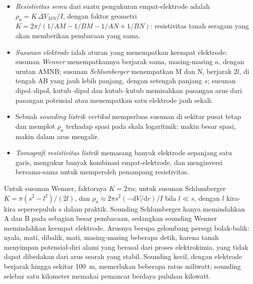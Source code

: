 \begin{definition}\label{def:b3:field-lab-methods-3:resistivity}
\leavevmode
\begin{itemize}
  \item \emph{Resistivitas semu} dari suatu
        pengukuran empat-elektrode adalah $\rho_a = K\,\Delta V_{MN}/I$, dengan
        faktor geometri $K = 2\pi/(1/AM - 1/BM - 1/AN + 1/BN)$: resistivitas
        tanah seragam yang akan memberikan
        pembacaan yang sama.
  \item \emph{Susunan elektrode} ialah aturan yang
        menempatkan keempat elektrode: susunan \emph{Wenner} menempatkannya
        berjarak sama, masing-masing $a$, dengan urutan AMNB; susunan
        \emph{Schlumberger} menempatkan M dan N, berjarak $2l$, di tengah
        AB yang jauh lebih panjang, dengan setengah panjang $s$; susunan dipol--dipol,
        kutub--dipol dan kutub--kutub memisahkan pasangan arus
        dari pasangan potensial atau menempatkan satu elektrode jauh sekali.
  \item Sebuah \emph{sounding listrik vertikal}
        memperluas susunan di sekitar pusat tetap dan memplot
        $\rho_a$ terhadap spasi pada skala logaritmik: makin besar
        spasi, makin dalam arus mengalir.
  \item \emph{Tomografi resistivitas listrik}
        memasang banyak elektrode sepanjang satu garis,
        mengukur banyak kombinasi empat-elektrode, dan menginversi
        bersama-sama untuk memperoleh penampang resistivitas.
\end{itemize}
\end{definition}

Untuk susunan Wenner, faktornya $K = 2\pi a$; untuk susunan Schlumberger
$K = \pi(s^2 - l^2)/(2l)$, dan $\rho_a \approx 2\pi s^2(-\mathrm{d}V/
\mathrm{d}r)/I$ bila $l \ll s$, dengan $l$ kira-kira sepersepuluh $s$ dalam
praktik. Sounding Schlumberger hanya memindahkan A dan B pada sebagian besar pembacaan,
sedangkan sounding Wenner memindahkan keempat elektrode. Arusnya berupa gelombang
persegi bolak-balik: nyala, mati, dibalik, mati, masing-masing beberapa detik, karena
tanah menyimpan potensial-diri alami yang berasal dari proses elektrokimia,
yang tidak dapat dibedakan dari arus searah yang stabil. Sounding kecil, dengan
elektrode berjarak hingga sekitar \qty{100}{m}, memerlukan beberapa ratus
miliwatt; sounding selebar satu kilometer memakai pemancar berdaya
puluhan kilowatt.


